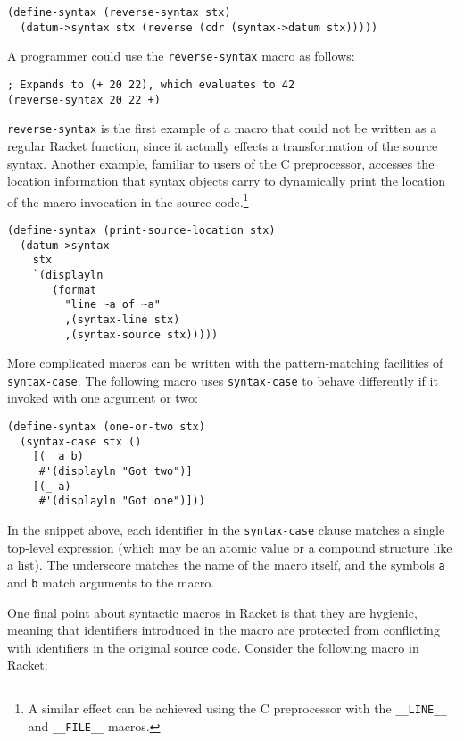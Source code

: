\documentclass{article}
\begin{document}
\begin{lstlisting}
(define-syntax (reverse-syntax stx)
  (datum->syntax stx (reverse (cdr (syntax->datum stx)))))
\end{lstlisting}

A programmer could use the \texttt{reverse-syntax} macro as follows:

\begin{lstlisting}
; Expands to (+ 20 22), which evaluates to 42
(reverse-syntax 20 22 +)
\end{lstlisting}

\texttt{reverse-syntax} is the first example of a macro that could not be written as a regular Racket function, since it actually effects a transformation of the source syntax. Another example, familiar to users of the C preprocessor, accesses the location information that syntax objects carry to dynamically print the location of the macro invocation in the source code.\footnote{A similar effect can be achieved using the C preprocessor with the \texttt{\_\_LINE\_\_} and \texttt{\_\_FILE\_\_} macros.}

\begin{lstlisting}
(define-syntax (print-source-location stx)
  (datum->syntax
    stx
    `(displayln
       (format
         "line ~a of ~a"
         ,(syntax-line stx)
         ,(syntax-source stx)))))
\end{lstlisting}

More complicated macros can be written with the pattern-matching facilities of \texttt{syntax-case}. The following macro uses \texttt{syntax-case} to behave differently if it invoked with one argument or two:

\begin{lstlisting}
(define-syntax (one-or-two stx)
  (syntax-case stx ()
    [(_ a b)
     #'(displayln "Got two")]
    [(_ a)
     #'(displayln "Got one")]))
\end{lstlisting}

In the snippet above, each identifier in the \texttt{syntax-case} clause matches a single top-level expression (which may be an atomic value or a compound structure like a list). The underscore matches the name of the macro itself, and the symbols \texttt{a} and \texttt{b} match arguments to the macro.

One final point about syntactic macros in Racket is that they are hygienic, meaning that identifiers introduced in the macro are protected from conflicting with identifiers in the original source code. Consider the following macro in Racket:
\end{document}
